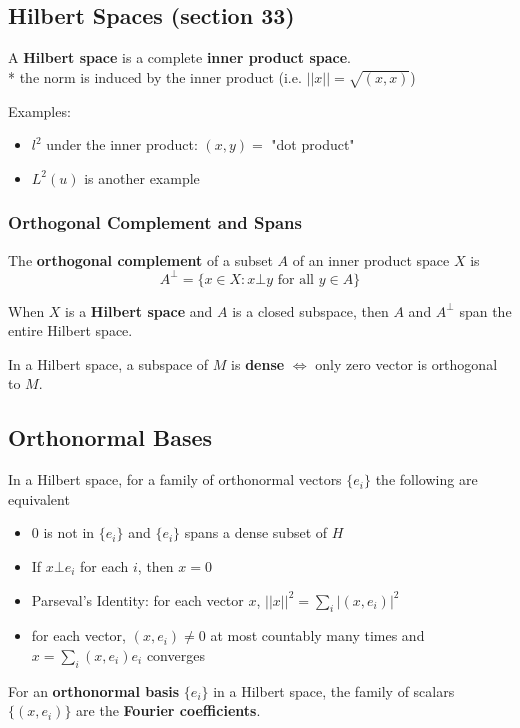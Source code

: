 \documentclass[a4paper, 12pt]{article}
\newcommand{\bt}[1]{\textbf{#1}} %
\newcommand{\gray}[1]{{\leavevmode\color[gray]{0.5}{#1}}} %
\begin{document}
\begin{multicols}{2}
\subsection{Hilbert Spaces (section 33)}

A \bt{Hilbert space} is a complete \bt{inner product space}.  \\
* the norm is induced by the inner product (i.e. $|| x || = \sqrt{(x, x)}$)

Examples: 
\begin{itemize}
    \item $l^2$ under the inner product: $(x, y) = $ "dot product"
    \item $L^2(u)$ is another example
\end{itemize}

\subsubsection{Orthogonal Complement and Spans}
The \bt{orthogonal complement} of a subset $A$  of an inner product space $X$ is 
$$A^\bot = \{x \in X: x \bot y \text{ for all } y \in A\}$$
\gray{"set of vector orthogonal to all vectors in A"}

When $X$ is a \bt{Hilbert space} and $A$ is a closed subspace, 
then $A$ and $A^\bot$ span the entire Hilbert space.

In a Hilbert space, a subspace of $M$ is \bt{dense} $\iff$
only zero vector is orthogonal to $M$.

\subsection{Orthonormal Bases}

In a Hilbert space, for a family of orthonormal vectors $\{e_i\}$ 
the following are equivalent
\begin{itemize}
    \item $0$ is not in $\{e_i\}$ and $\{e_i\}$ spans a dense subset of $H$
    \item If $x \bot e_i$ for each $i$, then $x = 0$
    \item Parseval's Identity: for each vector $x$, $|| x ||^2 = \sum_i |(x, e_i)|^2$
    \item for each vector, $(x, e_i) \neq 0$ at most countably many times and 
    $x = \sum_i (x, e_i)e_i$ converges
\end{itemize}

For an \bt{orthonormal basis} $\{e_i\}$ in a Hilbert space, 
the family of scalars $\{(x, e_i)\}$ are the \bt{Fourier coefficients}.


\end{multicols}
\end{document}
